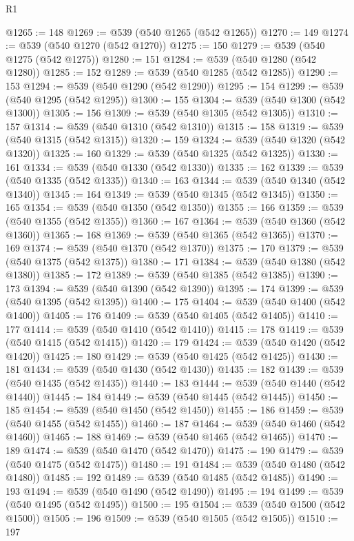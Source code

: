 \begin{lexlean}{R1}
\begin{coremodule}
@1265 := 148
@1269 := @539 (@540 @1265 (@542 @1265))
@1270 := 149
@1274 := @539 (@540 @1270 (@542 @1270))
@1275 := 150
@1279 := @539 (@540 @1275 (@542 @1275))
@1280 := 151
@1284 := @539 (@540 @1280 (@542 @1280))
@1285 := 152
@1289 := @539 (@540 @1285 (@542 @1285))
@1290 := 153
@1294 := @539 (@540 @1290 (@542 @1290))
@1295 := 154
@1299 := @539 (@540 @1295 (@542 @1295))
@1300 := 155
@1304 := @539 (@540 @1300 (@542 @1300))
@1305 := 156
@1309 := @539 (@540 @1305 (@542 @1305))
@1310 := 157
@1314 := @539 (@540 @1310 (@542 @1310))
@1315 := 158
@1319 := @539 (@540 @1315 (@542 @1315))
@1320 := 159
@1324 := @539 (@540 @1320 (@542 @1320))
@1325 := 160
@1329 := @539 (@540 @1325 (@542 @1325))
@1330 := 161
@1334 := @539 (@540 @1330 (@542 @1330))
@1335 := 162
@1339 := @539 (@540 @1335 (@542 @1335))
@1340 := 163
@1344 := @539 (@540 @1340 (@542 @1340))
@1345 := 164
@1349 := @539 (@540 @1345 (@542 @1345))
@1350 := 165
@1354 := @539 (@540 @1350 (@542 @1350))
@1355 := 166
@1359 := @539 (@540 @1355 (@542 @1355))
@1360 := 167
@1364 := @539 (@540 @1360 (@542 @1360))
@1365 := 168
@1369 := @539 (@540 @1365 (@542 @1365))
@1370 := 169
@1374 := @539 (@540 @1370 (@542 @1370))
@1375 := 170
@1379 := @539 (@540 @1375 (@542 @1375))
@1380 := 171
@1384 := @539 (@540 @1380 (@542 @1380))
@1385 := 172
@1389 := @539 (@540 @1385 (@542 @1385))
@1390 := 173
@1394 := @539 (@540 @1390 (@542 @1390))
@1395 := 174
@1399 := @539 (@540 @1395 (@542 @1395))
@1400 := 175
@1404 := @539 (@540 @1400 (@542 @1400))
@1405 := 176
@1409 := @539 (@540 @1405 (@542 @1405))
@1410 := 177
@1414 := @539 (@540 @1410 (@542 @1410))
@1415 := 178
@1419 := @539 (@540 @1415 (@542 @1415))
@1420 := 179
@1424 := @539 (@540 @1420 (@542 @1420))
@1425 := 180
@1429 := @539 (@540 @1425 (@542 @1425))
@1430 := 181
@1434 := @539 (@540 @1430 (@542 @1430))
@1435 := 182
@1439 := @539 (@540 @1435 (@542 @1435))
@1440 := 183
@1444 := @539 (@540 @1440 (@542 @1440))
@1445 := 184
@1449 := @539 (@540 @1445 (@542 @1445))
@1450 := 185
@1454 := @539 (@540 @1450 (@542 @1450))
@1455 := 186
@1459 := @539 (@540 @1455 (@542 @1455))
@1460 := 187
@1464 := @539 (@540 @1460 (@542 @1460))
@1465 := 188
@1469 := @539 (@540 @1465 (@542 @1465))
@1470 := 189
@1474 := @539 (@540 @1470 (@542 @1470))
@1475 := 190
@1479 := @539 (@540 @1475 (@542 @1475))
@1480 := 191
@1484 := @539 (@540 @1480 (@542 @1480))
@1485 := 192
@1489 := @539 (@540 @1485 (@542 @1485))
@1490 := 193
@1494 := @539 (@540 @1490 (@542 @1490))
@1495 := 194
@1499 := @539 (@540 @1495 (@542 @1495))
@1500 := 195
@1504 := @539 (@540 @1500 (@542 @1500))
@1505 := 196
@1509 := @539 (@540 @1505 (@542 @1505))
@1510 := 197

\end{coremodule}
\end{lexlean}
